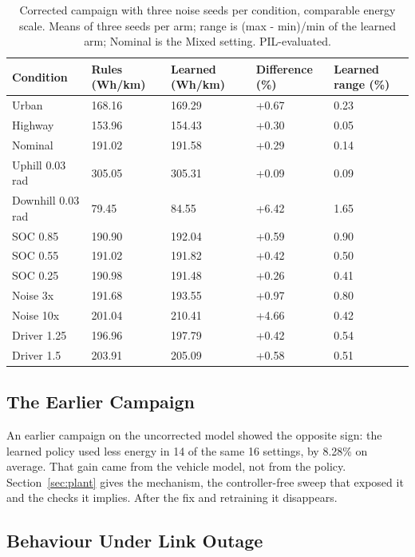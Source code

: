 \documentclass{ieeeaccess}
\begin{document}
\begin{table}[!t]
\centering
\caption{Corrected campaign with three noise seeds per condition, comparable energy scale. Means of three seeds per arm; range is (max - min)/min of the learned arm; Nominal is the Mixed setting. PIL-evaluated.}
\label{tab:ems-repeats}
\footnotesize
\setlength{\tabcolsep}{3pt}
\renewcommand{\arraystretch}{1.15}
\begin{tabularx}{\textwidth}{@{}XXXXX@{}}
\hline
\textbf{Condition} & \textbf{Rules (Wh/km)} & \textbf{Learned (Wh/km)} & \textbf{Difference (\%)} & \textbf{Learned range (\%)} \\
\hline
Urban & 168.16 & 169.29 & +0.67 & 0.23 \\
Highway & 153.96 & 154.43 & +0.30 & 0.05 \\
Nominal & 191.02 & 191.58 & +0.29 & 0.14 \\
Uphill 0.03 rad & 305.05 & 305.31 & +0.09 & 0.09 \\
Downhill 0.03 rad & 79.45 & 84.55 & +6.42 & 1.65 \\
SOC 0.85 & 190.90 & 192.04 & +0.59 & 0.90 \\
SOC 0.55 & 191.02 & 191.82 & +0.42 & 0.50 \\
SOC 0.25 & 190.98 & 191.48 & +0.26 & 0.41 \\
Noise 3x & 191.68 & 193.55 & +0.97 & 0.80 \\
Noise 10x & 201.04 & 210.41 & +4.66 & 0.42 \\
Driver 1.25 & 196.96 & 197.79 & +0.42 & 0.54 \\
Driver 1.5 & 203.91 & 205.09 & +0.58 & 0.51 \\
\hline
\end{tabularx}
\end{table}

\subsection{The Earlier Campaign}

An earlier campaign on the uncorrected model showed the opposite sign: the learned policy used less energy in 14 of the same 16 settings, by 8.28\% on average. That gain came from the vehicle model, not from the policy. Section~\ref{sec:plant} gives the mechanism, the controller-free sweep that exposed it and the checks it implies. After the fix and retraining it disappears.

\subsection{Behaviour Under Link Outage}
\end{document}
